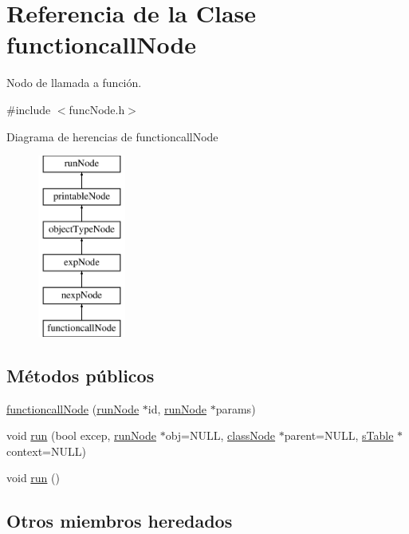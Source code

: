 \hypertarget{classfunctioncallNode}{\section{Referencia de la Clase functioncall\-Node}
\label{classfunctioncallNode}
}


Nodo de llamada a función.  




{\ttfamily \#include $<$func\-Node.\-h$>$}

Diagrama de herencias de functioncall\-Node\begin{figure}[H]
\begin{center}
\leavevmode
\includegraphics[height=6.000000cm]{classfunctioncallNode}
\end{center}
\end{figure}
\subsection*{Métodos públicos}
\begin{DoxyCompactItemize}
\item 
\hyperlink{classfunctioncallNode_ad71a799c62afebe4c50bae79b193cb4b}{functioncall\-Node} (\hyperlink{classrunNode}{run\-Node} $\ast$id, \hyperlink{classrunNode}{run\-Node} $\ast$params)
\item 
void \hyperlink{classfunctioncallNode_ae9ea903e354c71a78370e893cb8c8c29}{run} (bool excep, \hyperlink{classrunNode}{run\-Node} $\ast$obj=N\-U\-L\-L, \hyperlink{classclassNode}{class\-Node} $\ast$parent=N\-U\-L\-L, \hyperlink{classsTable}{s\-Table} $\ast$context=N\-U\-L\-L)
\item 
void \hyperlink{classfunctioncallNode_ab75cccac2ce7de1b68cb725ff24f5381}{run} ()
\end{DoxyCompactItemize}
\subsection*{Otros miembros heredados}


